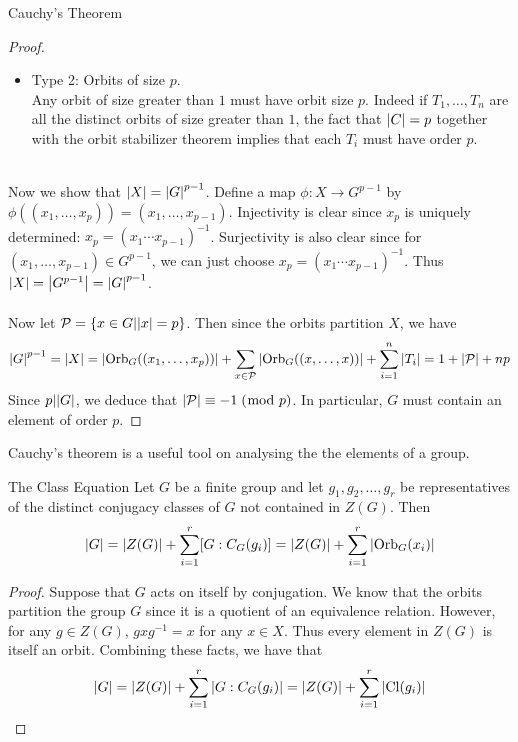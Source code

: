 \documentclass[a4paper]{article}
\begin{document}
\begin{thm}{Cauchy's Theorem}{}
\begin{proof}
\begin{itemize}
In fact, every orbit of size $1$ must be one of the above two cases. Suppose that $S$ is an orbit of size $1$. Let $(x_1,\dots,x_p)\in X$. Then the orbit stabilizer theorem implies that $\text{Stab}_C((x_1,\dots,x_p))=C$. Since $f=(1,\dots,p)\in C$, we have 
\begin{align*}
(x_1,\dots,x_p)&=f\cdot(x_1,\dots,x_p)\tag{$f\in\text{Stab}_C((x_1,\dots,x_p))$}\\
&=(x_2,\dots,x_p,x_1)
\end{align*} which means that $x_1=\dots=x_p$. This means that $x_1^p=1$. Since $p$ is a prime this means that $\abs{x_1}=1$ or $p$. In which either way it falls into one of the two above cases. 
\item Type 2: Orbits of size $p$. \\
Any orbit of size greater than $1$ must have orbit size $p$. Indeed if $T_1,\dots,T_n$ are all the distinct orbits of size greater than $1$, the fact that $\abs{C}=p$ together with the orbit stabilizer theorem implies that each $T_i$ must have order $p$. 
\end{itemize}~\\
Now we show that $\abs{X}=\abs{G}^{p-1}$. Define a map $\phi:X\to G^{p-1}$ by $\phi((x_1,\dots,x_p))=(x_1,\dots,x_{p-1})$. Injectivity is clear since $x_p$ is uniquely determined: $x_p=(x_1\cdots x_{p-1})^{-1}$. Surjectivity is also clear since for $(x_1,\dots,x_{p-1})\in G^{p-1}$, we can just choose $x_p=(x_1\cdots x_{p-1})^{-1}$. Thus $\abs{X}=\abs{G^{p-1}}=\abs{G}^{p-1}$. \\~\\

Now let $\mathcal{P}=\{x\in G|\abs{x}=p\}$. Then since the orbits partition $X$, we have $$\abs{G}^{p-1}=\abs{X}=\abs{\text{Orb}_G((x_1,\dots,x_p))}+\sum_{x\in\mathcal{P}}\abs{\text{Orb}_G((x,\dots,x))}+\sum_{i=1}^n\abs{T_i}=1+\abs{\mathcal{P}}+np$$ Since $p|\abs{G}$, we deduce that $\abs{\mathcal{P}}\equiv-1\;(\bmod\;p)$. In particular, $G$ must contain an element of order $p$. 
\end{proof}
\end{thm}

Cauchy's theorem is a useful tool on analysing the the elements of a group. 

\begin{thm}{The Class Equation}{} Let $G$ be a finite group and let $g_1,g_2,\dots,g_r$ be representatives of the distinct conjugacy classes of $G$ not contained in $Z(G)$. Then $$\abs{G}=\abs{Z(G)}+\sum_{i=1}^r[G:C_G(g_i)]=\abs{Z(G)}+\sum_{i=1}^r\abs{\text{Orb}_G(x_i)}$$ \tcbline
\begin{proof}
Suppose that $G$ acts on itself by conjugation. We know that the orbits partition the group $G$ since it is a quotient of an equivalence relation. However, for any $g\in Z(G)$, $gxg^{-1}=x$ for any $x\in X$. Thus every element in $Z(G)$ is itself an orbit. Combining these facts, we have that $$\abs{G}=\abs{Z(G)}+\sum_{i=1}^r\abs{G:C_G(g_i)}=\abs{Z(G)}+\sum_{i=1}^r\abs{\text{Cl}(g_i)}$$
\end{proof}
\end{thm}
\end{document}
